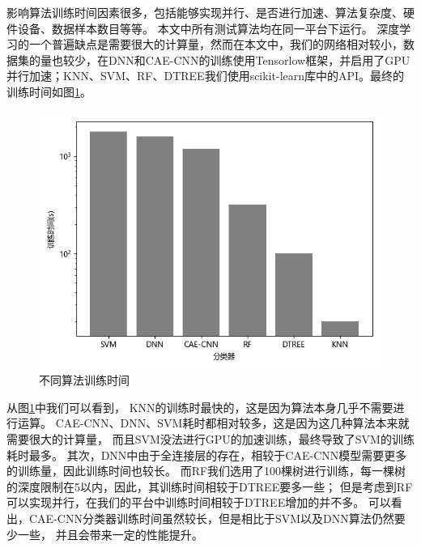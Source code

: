 影响算法训练时间因素很多，包括能够实现并行、是否进行加速、算法复杂度、硬件设备、数据样本数目等等。
本文中所有测试算法均在同一平台下运行。
深度学习的一个普遍缺点是需要很大的计算量，然而在本文中，我们的网络相对较小，数据集的量也较少，在DNN和CAE-CNN的训练使用Tensorlow框架，并启用了GPU并行加速；KNN、SVM、RF、DTREE我们使用scikit-learn库中的API。最终的训练时间如图\ref{sec:fig_3_12}。\par
\begin{figure}[!h]
	\centering
	\includegraphics[scale=0.65]{figures/chapter_3/fig_3_12}
	\caption{不同算法训练时间}	\label{sec:fig_3_12}
\end{figure}
从图\ref{sec:fig_3_12}中我们可以看到，
KNN的训练时最快的，这是因为算法本身几乎不需要进行运算。
CAE-CNN、DNN、SVM耗时都相对较多，这是因为这几种算法本来就需要很大的计算量，
而且SVM没法进行GPU的加速训练，最终导致了SVM的训练耗时最多。
其次，DNN中由于全连接层的存在，相较于CAE-CNN模型需要更多的训练量，因此训练时间也较长。
而RF我们选用了100棵树进行训练，每一棵树的深度限制在5以内，因此，其训练时间相较于DTREE要多一些；
但是考虑到RF可以实现并行，在我们的平台中训练时间相较于DTREE增加的并不多。
可以看出，CAE-CNN分类器训练时间虽然较长，但是相比于SVM以及DNN算法仍然要少一些，
并且会带来一定的性能提升。\par

